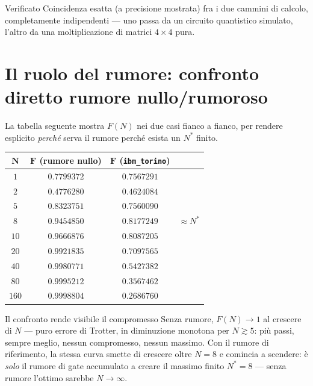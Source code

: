 \documentclass[11pt,a4paper]{article}
\begin{document}
\begin{okbox}{Verificato}
Coincidenza esatta (a precisione mostrata) fra i due cammini di calcolo,
completamente indipendenti --- uno passa da un circuito quantistico
simulato, l'altro da una moltiplicazione di matrici $4\times4$ pura.
\end{okbox}

\section{Il ruolo del rumore: confronto diretto rumore nullo/rumoroso}
\label{sec:confronto-rumore}

La tabella seguente mostra $F(N)$ nei due casi fianco a fianco, per
rendere esplicito \emph{perché} serva il rumore perché esista un
$N^*$ finito.

\begin{center}
\renewcommand{\arraystretch}{1.2}
\begin{tabular}{@{}cccc@{}}
\toprule
$\boldsymbol{N}$ & $\boldsymbol{F}$ \textbf{(rumore nullo)} & $\boldsymbol{F}$ \textbf{(\texttt{ibm\_torino})} & \\
\midrule
$1$ & $0.7799372$ & $0.7567291$ & \\
$2$ & $0.4776280$ & $0.4624084$ & \\
$5$ & $0.8323751$ & $0.7560090$ & \\
$8$ & $0.9454850$ & $0.8177249$ & $\approx N^*$\\
$10$ & $0.9666876$ & $0.8087205$ & \\
$20$ & $0.9921835$ & $0.7097565$ & \\
$40$ & $0.9980771$ & $0.5427382$ & \\
$80$ & $0.9995212$ & $0.3567462$ & \\
$160$ & $0.9998804$ & $0.2686760$ & \\
\bottomrule
\end{tabular}
\end{center}

\begin{okbox}{Il confronto rende visibile il compromesso}
Senza rumore, $F(N)\to1$ al crescere di $N$ --- puro errore di Trotter,
in diminuzione monotona per $N\gtrsim5$: più passi, sempre meglio, nessun
compromesso, nessun massimo. Con il rumore di riferimento, la stessa
curva smette di crescere oltre $N=8$ e comincia a scendere: è
\emph{solo} il rumore di gate accumulato a creare il massimo finito
$N^*=8$ --- senza rumore l'ottimo sarebbe $N\to\infty$.
\end{okbox}
\end{document}
